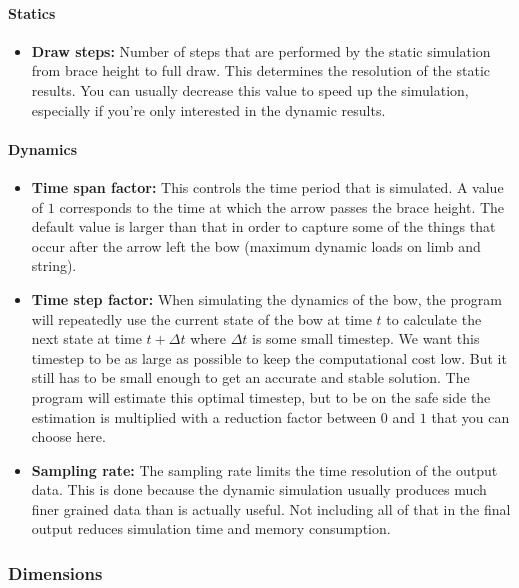 \documentclass[12pt]{article}
\begin{document}
\paragraph*{Statics}

\begin{itemize}
\item \textbf{Draw steps:} Number of steps that are performed by the static simulation from brace height to full draw. This determines the resolution of the static results. You can usually decrease this value to speed up the simulation, especially if you're only interested in the dynamic results.
\end{itemize}

\paragraph*{Dynamics}

\begin{itemize}
\item \textbf{Time span factor:} This controls the time period that is simulated. A value of $1$ corresponds to the time at which the arrow passes the brace height. The default value is larger than that in order to capture some of the things that occur after the arrow left the bow (maximum dynamic loads on limb and string).
\item \textbf{Time step factor:} When simulating the dynamics of the bow, the program will repeatedly use the current state of the bow at time $t$ to calculate the next state at time $t + \Delta t$ where $\Delta t$ is some small timestep. We want this timestep to be as large as possible to keep the computational cost low. But it still has to be small enough to get an accurate and stable solution. The program will estimate this optimal timestep, but to be on the safe side the estimation is multiplied with a reduction factor between $0$ and $1$ that you can choose here.
\item \textbf{Sampling rate:} The sampling rate limits the time resolution of the output data. This is done because the dynamic simulation usually produces much finer grained data than is actually useful. Not including all of that in the final output reduces simulation time and memory consumption.
\end{itemize}

\newpage
\subsubsection{Dimensions}
\label{sec:dimensions}
\end{document}
